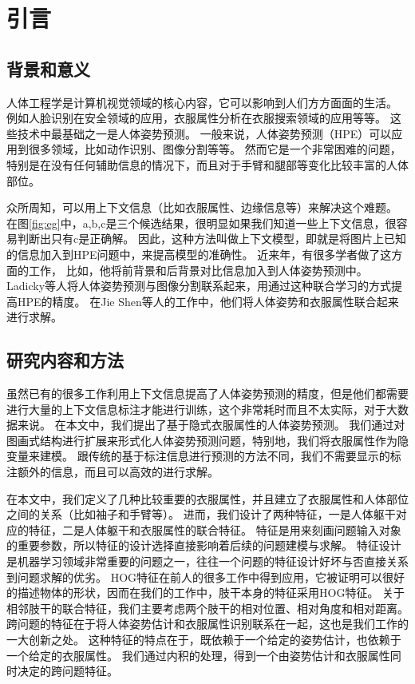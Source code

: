 
\chapter{引言}
\label{chap:intro}

\section{背景和意义}
人体工程学是计算机视觉领域的核心内容，它可以影响到人们方方面面的生活。
例如人脸识别在安全领域的应用，衣服属性分析在衣服搜索领域的应用等等。
这些技术中最基础之一是人体姿势预测。
一般来说，人体姿势预测（HPE）可以应用到很多领域，比如动作识别、图像分割等等。
然而它是一个非常困难的问题，特别是在没有任何辅助信息的情况下，而且对于手臂和腿部等变化比较丰富的人体部位。

众所周知，可以用上下文信息（比如衣服属性、边缘信息等）来解决这个难题。
在图\ref{fig:eg}中，a,b,c是三个候选结果，很明显如果我们知道一些上下文信息，很容易判断出只有c是正确解。
因此，这种方法叫做上下文模型，即就是将图片上已知的信息加入到HPE问题中，来提高模型的准确性。
近来年，有很多学者做了这方面的工作\cite{deeppose,cvpr09}， 比如\cite{deeppose}，他将前背景和后背景对比信息加入到人体姿势预测中。
Ladicky\cite{cvpr09}等人将人体姿势预测与图像分割联系起来，用通过这种联合学习的方式提高HPE的精度。
在Jie Shen\cite{shen2014unified}等人的工作中，他们将人体姿势和衣服属性联合起来进行求解\cite{cvpr09}。

\section{研究内容和方法}
虽然已有的很多工作利用上下文信息提高了人体姿势预测的精度，但是他们都需要进行大量的上下文信息标注才能进行训练，这个非常耗时而且不太实际，对于大数据来说。
在本文中，我们提出了基于隐式衣服属性的人体姿势预测。
我们通过对图画式结构进行扩展来形式化人体姿势预测问题，特别地，我们将衣服属性作为隐变量来建模。
跟传统的基于标注信息进行预测的方法不同，我们不需要显示的标注额外的信息，而且可以高效的进行求解。


在本文中，我们定义了几种比较重要的衣服属性，并且建立了衣服属性和人体部位之间的关系（比如袖子和手臂等）。
进而，我们设计了两种特征，一是人体躯干对应的特征，二是人体躯干和衣服属性的联合特征。
特征是用来刻画问题输入对象的重要参数，所以特征的设计选择直接影响着后续的问题建模与求解。 特征设计是机器学习领域非常重要的问题之一，往往一个问题的特征设计好坏与否直接关系到问题求解的优劣。 HOG特征在前人的很多工作中得到应用，它被证明可以很好的描述物体的形状，因而在我们的工作中，肢干本身的特征采用HOG特征。 关于相邻肢干的联合特征，我们主要考虑两个肢干的相对位置、相对角度和相对距离。
跨问题的特征在于将人体姿势估计和衣服属性识别联系在一起，这也是我们工作的一大创新之处。 这种特征的特点在于，既依赖于一个给定的姿势估计，也依赖于一个给定的衣服属性。 我们通过内积的处理，得到一个由姿势估计和衣服属性同时决定的跨问题特征。

